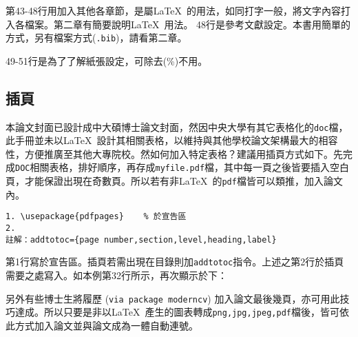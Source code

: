   


第43-48行用\verb||加入其他各章節，是屬\LaTeX\ 的用法，如同打字一般，將文字內容打入各檔案。第二章有簡要說明\LaTeX\ 用法。
48行是參考文獻設定。本書用簡單的方式，另有檔案方式({\tt.bib})，請看第二章。

49-51行是為了了解紙張設定，可除去(\%)不用。

\subsection{插頁}
本論文封面已設計成中大碩博士論文封面，然因中央大學有其它表格化的{\tt doc}檔，此手冊並未以\LaTeX\ 設計其相關表格，以維持與其他學校論文架構最大的相容性，方便推廣至其他大專院校。然如何加入特定表格？建議用插頁方式如下。先完成{\tt DOC}相關表格，排好順序，再存成{\tt myfile.pdf}檔，其中每一頁之後皆要插入空白頁，才能保證出現在奇數頁。所以若有非\LaTeX\ 的{\tt pdf}檔皆可以類推，加入論文內。
\begin{verbatim}
1. \usepackage{pdfpages}    % 於宣告區
2. 
註解：addtotoc={page number,section,level,heading,label}
\end{verbatim}

第1行寫於宣告區。插頁若需出現在目錄則加{\tt addtotoc}指令。上述之第2行於插頁需要之處寫入。如本例第32行所示，再次顯示於下：

另外有些博士生將履歷 ({\tt via package moderncv}) 加入論文最後幾頁，亦可用此技巧達成。所以只要是非以\LaTeX\ 產生的圖表轉成{\tt png,jpg,jpeg,pdf}檔後，皆可依此方式加入論文並與論文成為一體自動連號。

